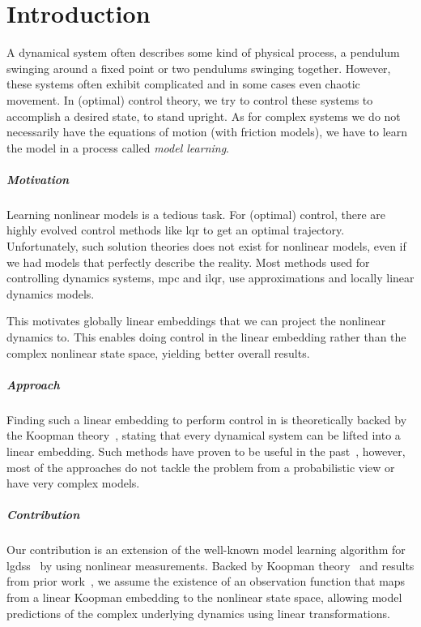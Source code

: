 \chapter{Introduction}
\label{c:introduction}



A dynamical system often describes some kind of physical process, \eg a pendulum swinging around a fixed point or two pendulums swinging together. However, these systems often exhibit complicated and in some cases even chaotic movement. In (optimal) control theory, we try to control these systems to accomplish a desired state, \eg to stand upright. As for complex systems we do not necessarily have the equations of motion (\eg with friction models), we have to learn the model in a process called \emph{model learning}.

\paragraph{Motivation}
	Learning nonlinear models is a tedious task. For (optimal) control, there are highly evolved control methods like \ac{lqr} to get an optimal trajectory. Unfortunately, such solution theories does not exist for nonlinear models, even if we had models that perfectly describe the reality. Most methods used for controlling dynamics systems, \eg \ac{mpc} and \ac{ilqr}, use approximations and locally linear dynamics models.

	This motivates globally linear embeddings that we can project the nonlinear dynamics to. This enables doing control in the linear embedding rather than the complex nonlinear state space, yielding better overall results.

\paragraph{Approach}
	Finding such a linear embedding to perform control in is theoretically backed by the Koopman theory~\cite{koopmanHamiltonianSystemsTransformation1931}, stating that every dynamical system can be lifted into a linear embedding. Such methods have proven to be useful in the past~\cite{kaiserDatadrivenDiscoveryKoopman2020,hanDeepLearningKoopman2020,mortonDeepVariationalKoopman2019a}, however, most of the approaches do not tackle the problem from a probabilistic view or have very complex models.

\paragraph{Contribution}
	Our contribution is an extension of the well-known model learning algorithm for \acp{lgds}~\cite{ghahramaniParameterEstimationLinear1996,minkaHiddenMarkovModels1999} by using nonlinear measurements. Backed by Koopman theory~\cite{koopmanHamiltonianSystemsTransformation1931} and results from prior work~\cite{luschDeepLearningUniversal2018}, we assume the existence of an observation function that maps from a linear Koopman embedding to the nonlinear state space, allowing model predictions of the complex underlying dynamics using linear transformations.

